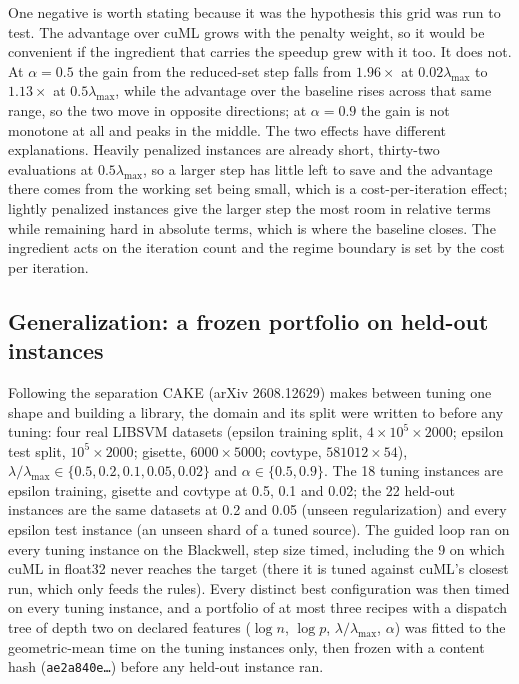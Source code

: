 One negative is worth stating because it was the hypothesis this grid was run
to test. The advantage over cuML grows with the penalty weight, so it would be
convenient if the ingredient that carries the speedup grew with it too. It does
not. At $\alpha = 0.5$ the gain from the reduced-set step falls from
$1.96\times$ at $0.02\lambda_{\max}$ to $1.13\times$ at $0.5\lambda_{\max}$,
while the advantage over the baseline rises across that same range, so the two
move in opposite directions; at $\alpha = 0.9$ the gain is not monotone at all
and peaks in the middle. The two effects have different explanations. Heavily
penalized instances are already short, thirty-two evaluations at
$0.5\lambda_{\max}$, so a larger step has little left to save and the advantage
there comes from the working set being small, which is a cost-per-iteration
effect; lightly penalized instances give the larger step the most room in
relative terms while remaining hard in absolute terms, which is where the
baseline closes. The ingredient acts on the iteration count and the regime
boundary is set by the cost per iteration.

\subsection{Generalization: a frozen portfolio on held-out instances}
\label{app:log:general}

 Following
the separation CAKE (arXiv 2608.12629) makes between tuning one shape and building a
library, the domain and its split were written to before any
tuning: four real LIBSVM datasets (epsilon training split,
$4\times10^5\times2000$; epsilon test split, $10^5\times2000$; gisette, $6000\times5000$;
covtype, $581012\times54$), $\lambda/\lambda_{\max}\in\{0.5, 0.2, 0.1, 0.05, 0.02\}$ and
$\alpha\in\{0.5, 0.9\}$. The 18 tuning instances are epsilon training, gisette and
covtype at 0.5, 0.1 and 0.02; the 22 held-out instances are the same datasets at 0.2
and 0.05 (unseen regularization) and every epsilon test instance (an unseen shard of a
tuned source). The guided loop ran on every tuning instance on the Blackwell, step
size timed, including the 9 on which cuML in float32 never reaches the target (there
it is tuned against cuML's closest run, which only feeds the rules). Every distinct
best configuration was then timed on every tuning instance, and a portfolio of at most
three recipes with a dispatch tree of depth two on declared features ($\log n$,
$\log p$, $\lambda/\lambda_{\max}$, $\alpha$) was fitted to the geometric-mean time on the
tuning instances only, then frozen with a content hash (\texttt{ae2a840e\ldots}) before
any held-out instance ran.

